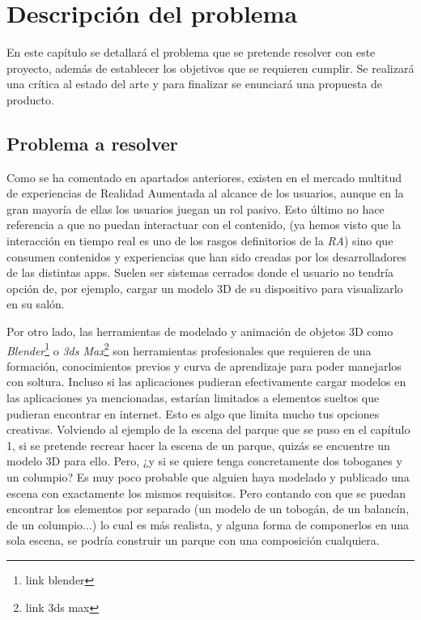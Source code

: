 \chapter{Descripción del problema}

En este capítulo se detallará el problema que se pretende resolver con este proyecto, además de establecer los objetivos que se requieren cumplir. Se realizará una crítica al estado del arte y para finalizar se enunciará una propuesta de producto.

\section{Problema a resolver}
Como se ha comentado en apartados anteriores, existen en el mercado multitud de experiencias de Realidad Aumentada al alcance de los usuarios, aunque en la gran mayoría de ellas los usuarios juegan un rol pasivo. Esto último no hace referencia a que no puedan interactuar con el contenido, (ya hemos visto que la interacción en tiempo real es uno de los rasgos definitorios de la \textit{RA}) sino que consumen contenidos y experiencias que han sido creadas por los desarrolladores de las distintas apps. Suelen ser sistemas cerrados donde el usuario no tendría opción de, por ejemplo, cargar un modelo 3D de su dispositivo para visualizarlo en su salón.

Por otro lado, las herramientas de modelado y animación de objetos 3D como \textit{Blender}\footnote{link blender} o \textit{3ds Max}\footnote{link 3ds max} son herramientas profesionales que requieren de una formación, conocimientos previos y curva de aprendizaje para poder manejarlos con soltura. Incluso si las aplicaciones pudieran efectivamente cargar modelos en las aplicaciones ya mencionadas, estarían limitados a elementos sueltos que pudieran encontrar en internet. Esto es algo que limita mucho tus opciones creativas. Volviendo al ejemplo de la escena del parque que se puso en el capítulo 1, si se pretende recrear hacer la escena de un parque, quizás se encuentre un modelo 3D para ello. Pero, ¿y si se quiere tenga concretamente dos toboganes y un columpio? Es muy poco probable que alguien haya modelado y publicado una escena con exactamente los mismos requisitos. Pero contando con que se puedan encontrar los elementos por separado (un modelo de un tobogán, de un balancín, de un columpio...) lo cual es más realista, y alguna forma de componerlos en una sola escena, se podría construir un parque con una composición cualquiera.

